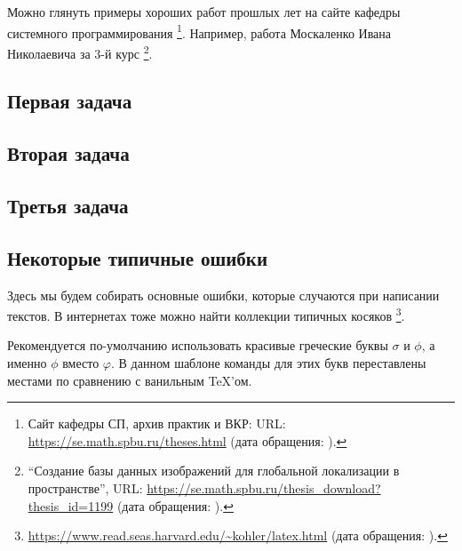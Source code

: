 Можно глянуть примеры хороших работ прошлых лет на сайте кафедры системного программирования%
\footnote{Сайт кафедры СП, архив практик и ВКР: URL: \url{https://se.math.spbu.ru/theses.html} (дата обращения: ).}.
Например, работа Москаленко Ивана Николаевича за 3-й курс%
\footnote{\enquote{Создание базы данных изображений для глобальной локализации в пространстве}, URL: \url{https://se.math.spbu.ru/thesis_download?thesis_id=1199} (дата обращения: ).}.

\subsection{Первая задача}
\label{subsec:task1}

\subsection{Вторая задача}
\label{subsec:task2}

\subsection{Третья задача}
\label{subsec:task3}

\subsection{Некоторые типичные ошибки}
Здесь мы будем собирать основные ошибки, которые случаются при написании текстов.
В интернетах тоже можно найти коллекции типич\-ных косяков%
\footnote{\href{https://www.read.seas.harvard.edu/~kohler/latex.html}{https://www.read.seas.harvard.edu/\textasciitilde kohler/latex.html} (дата обращения: ).}.

Рекомендуется по-умол\-ча\-нию использовать красивые греческие бук\-вы $\sigma$  и $\phi$, а именно $\phi$ вместо $\varphi$.
В данном шаблоне команды для этих букв переставлены местами по сравнению с ванильным \TeX'ом.

